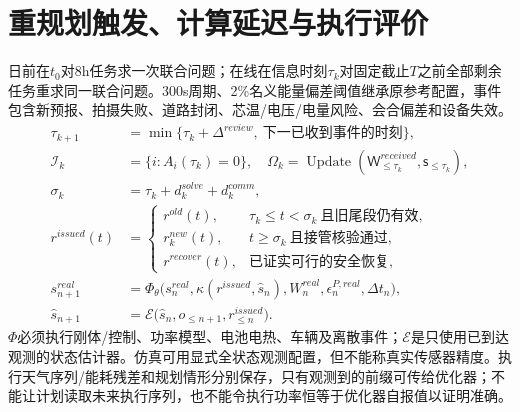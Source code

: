 \section{重规划触发、计算延迟与执行评价}
\noindent 日前在$t_0$对8h任务求一次联合问题；在线在信息时刻$\tau_k$对固定截止$T$之前全部剩余任务重求同一联合问题。300s周期、2\%名义能量偏差阈值继承原参考配置，事件包含新预报、拍摄失败、道路封闭、芯温/电压/电量风险、会合偏差和设备失效。
\begin{align}
 \tau_{k+1}&=\min\{\tau_k+\Delta^{review},\ \text{下一已收到事件的时刻}\},\\
 \mathcal I_k&=\{i:A_i(\tau_k)=0\},\quad
 \Omega_k=\operatorname{Update}(\mathsf W^{received}_{\le\tau_k},\mathsf s_{\le\tau_k}),\\
 \sigma_k&=\tau_k+d_k^{solve}+d_k^{comm},\label{eng:eq:takeover}\\
 r^{issued}(t)&=\begin{cases}
 r^{old}(t),&\tau_k\le t<\sigma_k\ \text{且旧尾段仍有效},\\
 r_k^{new}(t),&t\ge\sigma_k\ \text{且接管核验通过},\\
 r^{recover}(t),&\text{已证实可行的安全恢复},
 \end{cases}\label{eng:eq:issuedpolicy}\\
 s^{real}_{n+1}&=\Phi_{\theta}\big(s^{real}_n,\kappa(r^{issued},\widehat s_n),
                         W^{real}_n,\epsilon^{P,real}_n,\Delta t_n\big),\\
 \widehat s_{n+1}&=\mathcal E\big(\widehat s_n,o_{\le n+1},r^{issued}_{\le n}\big).
 \label{eng:eq:execution}
\end{align}
\noindent $\Phi$必须执行刚体/控制、功率模型、电池电热、车辆及离散事件；$\mathcal E$是只使用已到达观测的状态估计器。仿真可用显式全状态观测配置，但不能称真实传感器精度。执行天气序列/能耗残差和规划情形分别保存，只有观测到的前缀可传给优化器；不能让计划读取未来执行序列，也不能令执行功率恒等于优化器自报值以证明准确。
\clearpage
